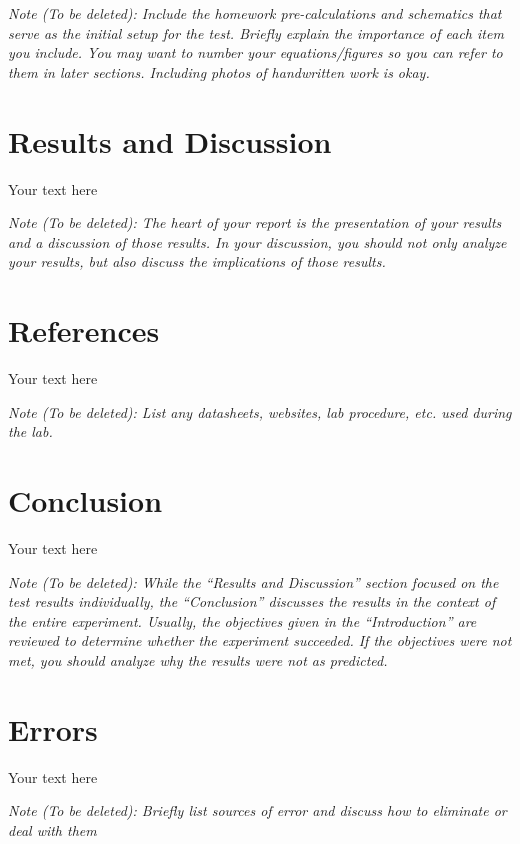 \documentclass[10pt]{article}
\begin{document}
\medskip

\textit{Note (To be deleted): Include the homework pre-calculations and schematics that serve as the initial setup for the test. Briefly explain the importance of each item you include. You may want to number your equations/figures so you can refer to them in later sections. Including photos of handwritten work is okay.}

\section{Results and Discussion}

Your text here

\medskip

\textit{Note (To be deleted): The heart of your report is the presentation of your results and a discussion of those results. In your discussion, you should not only analyze your results, but also discuss the implications of those results.}

\section{References}

Your text here

\medskip

\textit{Note (To be deleted): List any datasheets, websites, lab procedure, etc. used during the lab.}

\section{Conclusion}

Your text here

\medskip

\textit{Note (To be deleted): While the ``Results and Discussion'' section focused on the test results individually, the ``Conclusion'' discusses the results in the context of the entire experiment. Usually, the objectives given in the ``Introduction'' are reviewed to determine whether the experiment succeeded. If the objectives were not met, you should analyze why the results were not as predicted.}

\section{Errors}

Your text here

\medskip

\textit{Note (To be deleted): Briefly list sources of error and discuss how to eliminate or deal with them}
\end{document}
